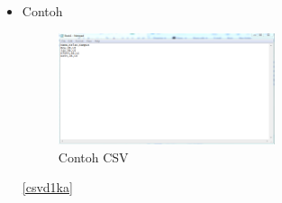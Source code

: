 \begin{enumerate}
\begin{itemize}
			\item Contoh 
				\begin{figure} [ht]
					\centerline{\includegraphics[width=0.6\textwidth]{figures/chapter4/csvd1ka.png}}
						\caption{Contoh CSV}
							\label{Contoh CSV}
				\end{figure}
			\ref{csvd1ka}
		\end{itemize}
		
		
	

\end{enumerate}
